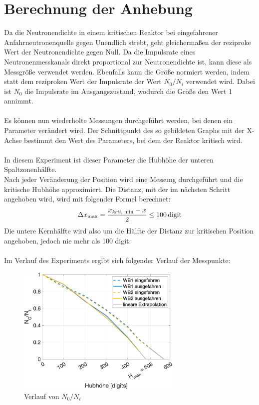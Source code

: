 \documentclass[12pt,german]{article}
\begin{document}
    \section{Berechnung der Anhebung}
    Da die Neutronendichte in einem kritischen Reaktor bei eingefahrener Anfahrneutronenquelle gegen Unendlich strebt, geht gleichermaßen der reziproke Wert der Neutronendichte gegen Null.
    Da die Impulsrate eines Neutronenmesskanals direkt proportional zur Neutronendichte ist, kann diese als Messgröße verwendet werden.
    Ebenfalls kann die Größe normiert werden, indem statt dem reziproken Wert der Impulsrate der Wert $N_0 / N_i$ verwendet wird. Dabei ist $N_0$ die Impulsrate im Ausgangszustand, wodurch die Größe den Wert 1 annimmt.
    \\ \\
    Es können nun wiederholte Messungen durchgeführt werden, bei denen ein Parameter verändert wird. Der Schnittpunkt des so gebildeten Graphs mit der X-Achse bestimmt den Wert des Parameters, bei dem der Reaktor kritisch wird.
    \\ \\
    In diesem Experiment ist dieser Parameter die Hubhöhe der unteren Spaltzonenhälfte.
    \\
    Nach jeder Veränderung der Position wird eine Messung durchgeführt und die kritische Hubhöhe approximiert. Die Distanz, mit der im nächsten Schritt angehoben wird, wird mit folgender Formel berechnet:
    \begin{align*}
        \Delta x_\text{max} = \frac{x_\text{\emph{krit}, min} - x}{2} \leq 100\, \text{digit}
    \end{align*}
    Die untere Kernhälfte wird also um die Hälfte der Distanz zur kritischen Position angehoben, jedoch nie mehr als 100 digit.
    \\ \\
    Im Verlauf des Experiments ergibt sich folgender Verlauf der Messpunkte:
    \begin{figure}[H]
        \centering
        \includegraphics[width=0.7\textwidth]{relativeCount.png}
        \caption{Verlauf von $N_0 / N_i$}
        \label{fig:relativeCount}
    \end{figure}
\end{document}

